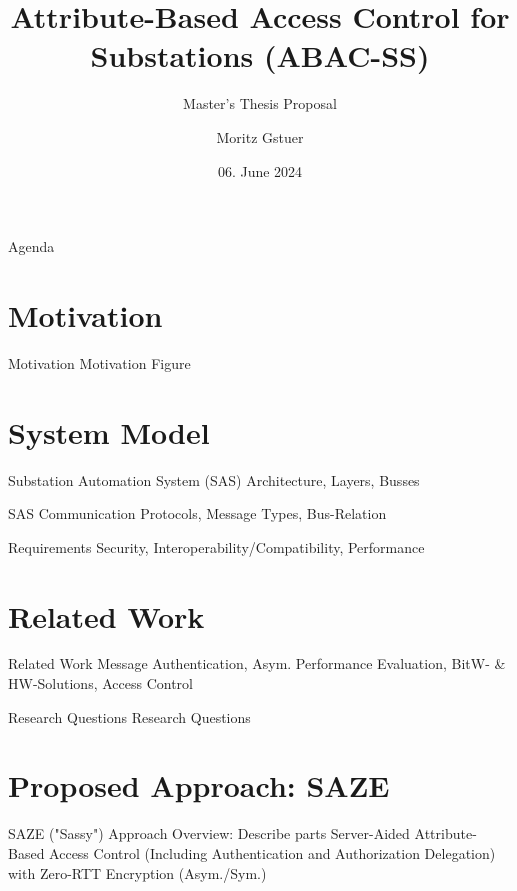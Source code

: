 \documentclass[en]{sdqbeamer}
\title[ABAC for Substations]{Attribute-Based Access Control for Substations (ABAC-SS)}
\subtitle{Master's Thesis Proposal}
\author[Moritz Gstuer]{Moritz Gstuer}
\date[06.\,06.\,2024]{06. June 2024}
\begin{document}
 
\KITtitleframe

\begin{frame}{Agenda}
\tableofcontents
\end{frame}

\section{Motivation}
\begin{frame}{Motivation}
    Motivation Figure
\end{frame}

\section{System Model}
\begin{frame}{Substation Automation System (SAS)}
    Architecture, Layers, Busses
\end{frame}

\begin{frame}{SAS Communication}
    Protocols, Message Types, Bus-Relation
\end{frame}

\begin{frame}{Requirements}
    Security, Interoperability/Compatibility, Performance
\end{frame}

\section{Related Work}
\begin{frame}{Related Work}
    Message Authentication, Asym. Performance Evaluation, BitW- \& HW-Solutions, Access Control
\end{frame}

\begin{frame}{Research Questions}
    Research Questions
\end{frame}

\section{Proposed Approach: SAZE}
\begin{frame}{SAZE ("Sassy") Approach}
    Overview: Describe parts Server-Aided Attribute-Based Access Control (Including Authentication and Authorization Delegation) with Zero-RTT Encryption (Asym./Sym.)
\end{frame}
\end{document}
